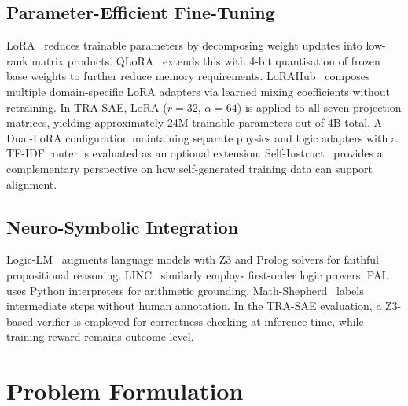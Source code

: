 \documentclass{ieeeaccess}
\newcommand{\modelname}{\textsc{TRA-SAE}}
\begin{document}
\subsection{Parameter-Efficient Fine-Tuning}

LoRA~\cite{b7} reduces trainable parameters by decomposing weight updates
into low-rank matrix products.
QLoRA~\cite{b18} extends this with 4-bit quantisation of frozen base
weights to further reduce memory requirements.
LoRAHub~\cite{b19} composes multiple domain-specific LoRA adapters via
learned mixing coefficients without retraining.
In \modelname{}, LoRA ($r=32$, $\alpha=64$) is applied to all seven
projection matrices, yielding approximately 24M trainable parameters out
of 4B total.
A Dual-LoRA configuration maintaining separate physics and logic adapters
with a TF-IDF router is evaluated as an optional extension.
Self-Instruct~\cite{b28} provides a complementary perspective on how
self-generated training data can support alignment.

\subsection{Neuro-Symbolic Integration}

Logic-LM~\cite{b12} augments language models with Z3 and Prolog solvers
for faithful propositional reasoning.
LINC~\cite{b27} similarly employs first-order logic provers.
PAL~\cite{b13} uses Python interpreters for arithmetic grounding.
Math-Shepherd~\cite{b14} labels intermediate steps without human
annotation.
In the \modelname{} evaluation, a Z3-based verifier is employed for
correctness checking at inference time, while training reward remains
outcome-level.

\section{Problem Formulation}
\label{sec:problem}
\end{document}
